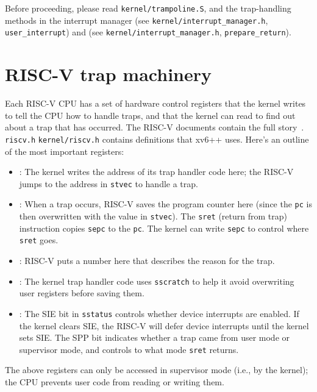 Before proceeding, please read {\tt kernel/trampoline.S},
and the trap-handling methods in the interrupt manager
(see \texttt{kernel/interrupt\_manager.h}, \texttt{user\_interrupt})
and (see \texttt{kernel/interrupt\_manager.h}, \texttt{prepare\_return}).

\section{RISC-V trap machinery}

Each RISC-V CPU has a set of hardware control registers that the kernel writes to
tell the CPU how to handle traps, and that the kernel can read
to find out about a trap that has occurred. The RISC-V documents
contain the full story~\cite{riscv:priv}. {\tt riscv.h}
\texttt{kernel/riscv.h} contains definitions that xv6++ uses. Here's
an outline of the most important registers:

\begin{itemize}

\item {}: The kernel writes the address of its trap handler
  code here; the RISC-V jumps to the address in {\tt stvec} to handle a trap.

\item {}: When a trap occurs, RISC-V saves the program counter
  here (since the {\tt pc} is then overwritten with the
  value in {\tt stvec}). The
  {\tt sret} (return from trap) instruction copies {\tt sepc} to the
  {\tt pc}. The kernel can write {\tt sepc} to control where {\tt
    sret} goes.

\item {}: RISC-V puts a number here that describes
the reason for the trap.

\item {}: The kernel trap handler code uses {\tt sscratch}
  to help it avoid overwriting user registers before saving them.

\item {}: The SIE bit in {\tt sstatus}
  controls whether device interrupts
  are enabled. If the kernel clears SIE, the RISC-V will defer
  device interrupts until the kernel sets SIE. The SPP bit
  indicates whether a trap came from user mode or supervisor
  mode, and controls to what mode {\tt sret} returns.

\end{itemize}

The above registers can only be accessed in supervisor mode (i.e., by
the kernel); the CPU prevents user code from reading or writing them.

